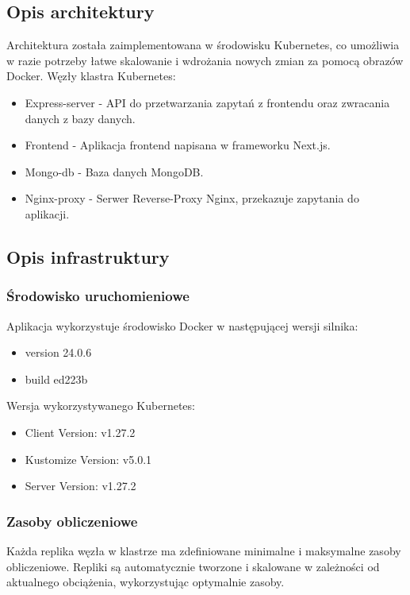 \documentclass[12pt,a4paper]{article}
\begin{document}
\subsection{Opis architektury}
\label{sec:introduction}
Architektura została zaimplementowana w środowisku Kubernetes, co umożliwia w razie potrzeby łatwe skalowanie i wdrożania nowych zmian za pomocą obrazów Docker. Węzły  klastra Kubernetes: 
\begin{itemize}
    \item Express-server - API do przetwarzania zapytań z frontendu oraz zwracania danych z bazy danych.
    \item Frontend - Aplikacja frontend napisana w frameworku Next.js.
    \item Mongo-db - Baza danych MongoDB.
    \item Nginx-proxy - Serwer Reverse-Proxy Nginx, przekazuje zapytania do aplikacji.
   
\end{itemize}

\subsection{Opis infrastruktury}
\label{sec:Users}

\subsubsection{Środowisko uruchomieniowe}
Aplikacja wykorzystuje środowisko Docker w następującej wersji silnika:
\begin{itemize}
    \item version 24.0.6
    \item build ed223b
\end{itemize}

Wersja wykorzystywanego Kubernetes: 
\begin{itemize}
    \item Client Version: v1.27.2
    \item Kustomize Version: v5.0.1
    \item Server Version: v1.27.2
\end{itemize}

\subsubsection{Zasoby obliczeniowe}
Każda replika węzła w klastrze ma zdefiniowane minimalne i maksymalne zasoby obliczeniowe. Repliki są automatycznie tworzone i skalowane w zależności od aktualnego obciążenia, wykorzystując optymalnie zasoby.
\end{document}
